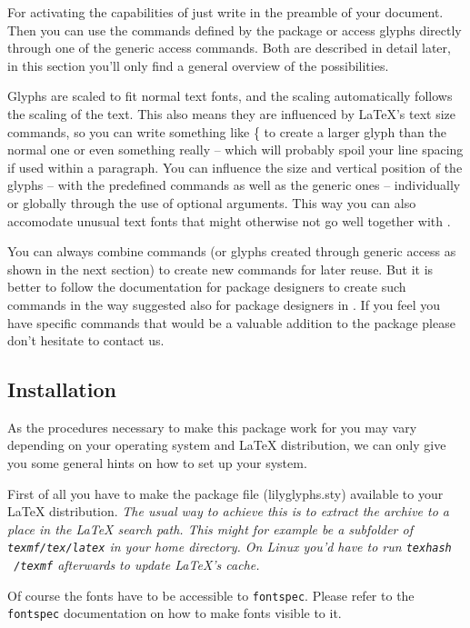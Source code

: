 \documentclass{article}
\begin{document}
\bigskip
For activating the capabilities of \lilyglyphs just write  in the preamble of your document. 
Then you can use the commands defined by the package or access glyphs directly through one of the generic access commands.
Both are described in detail later, in this section you'll only find a general overview of the possibilities.

Glyphs are scaled to fit normal text fonts, and the scaling automatically follows the scaling of the text. 
This also means they are influenced by \LaTeX 's text size commands, so you can write something like \{ to create a larger {\Large \flat}glyph than the normal \flat one or even something really  {\Huge {}} -- which will probably spoil your line spacing if used within a paragraph. 
You can influence the size and vertical position of the glyphs -- with the predefined commands as well as the generic ones -- individually or globally through the use of optional arguments.
This way you can also accomodate unusual text fonts that might otherwise not go well together with \lilyglyphs.

You can always combine commands (or glyphs created through generic access as shown in the next section) to create new commands for later reuse. 
But it is better to follow the documentation for package designers to create such commands in the way suggested also for package designers in .
If you feel you have specific commands that would be a valuable addition to the package please don't hesitate to contact us.

\subsection{Installation}
\label{subsec:installation}
As the procedures necessary to make this package work for you may vary depending on your operating system and \LaTeX{} distribution, we can only give you some general hints on how to set up your system.

First of all you have to make the package file (lilyglyphs.sty) available to your \LaTeX{} distribution. \textit{The usual way to achieve this is to extract the archive to a place in the \LaTeX{} search path. This might for example be a subfolder of \texttt{texmf/tex/latex} in your home directory. On Linux you'd have to run \texttt{texhash ~/texmf} afterwards to update \LaTeX's cache.}

Of course the fonts have to be accessible to \texttt{fontspec}. 
Please refer to the \texttt{fontspec} documentation on how to make fonts visible to it. 
\end{document}

